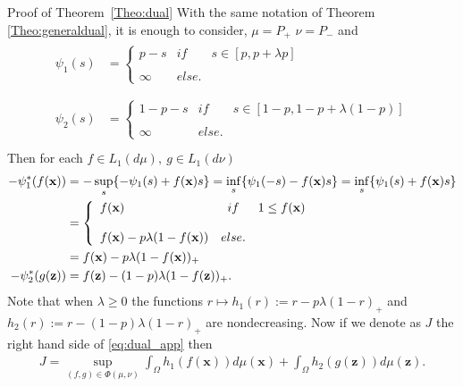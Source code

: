 Proof of Theorem~\ref{Theo:dual}
With the same notation of Theorem \ref{Theo:generaldual}, it is enough to consider, $\mu=P_+$ $\nu=P_-$ and
\begin{align}
	\begin{split}\label{eq:coro:dual_general}
	\psi_1(s)&=\left\{ \begin{array}{lcc}
             p-s &   if  & s\in [p, p+\lambda p]\\
             \\ \infty &  else. &
             \end{array}
   \right.\\
	\end{split}\\
	\begin{split}\label{eq:coro:dual_general2}
	\psi_2(s)&=\left\{ \begin{array}{lcc}
             1-p-s &   if  & s\in [1-p, 1-p+\lambda (1-p)]\\
             \\ \infty &  else. &
             \end{array}
   \right.\\
	\end{split}
\end{align}
 Then for each $f\in L_1(d\mu), \ g\in L_1(d\nu)$
\begin{align*}
-\psi_1^*(f(\textbf{x}))&=-\sup_{s}	\{ -\psi_1(s)+f(\textbf{x})s\}=\inf_{s}	\{ \psi_1(-s)-f(\textbf{x})s\}=\inf_{s}	\{ \psi_1(s)+f(\textbf{x})s\}\\
&=\left\{ \begin{array}{lcc}
             f(\textbf{x}) &   if  & 1\leq f(\textbf{x})\\
             \\ f(\textbf{x})-p\lambda(1-f(\textbf{x})) &  else. &
             \end{array}
   \right.\\&=f(\textbf{x})-p\lambda(1-f(\textbf{x}))_+\\
-\psi_2^*(g(\textbf{{{\textbf{z}}}}))&= f(\textbf{{{\textbf{z}}}})-(1-p)\lambda(1-f(\textbf{{{\textbf{z}}}}))_+.
\end{align*}
Note that when $\lambda\geq 0$ the functions $r\mapsto h_1(r):=r-p\lambda(1-r)_+$ and $h_2(r):=r-(1-p)\lambda(1-r)_+$ are nondecreasing. Now if we denote as $J$ the right hand side of \eqref{eq:dual_app} then 
\begin{align*}
	J=\sup_{(f,g)\in \Phi(\mu, \nu)}\int_{\Omega}h_1(f({\textbf{x}}))d\mu({\textbf{x}})+\int_{\Omega}h_2(g({{\textbf{z}}}))d\mu({{\textbf{z}}}).
\end{align*}
